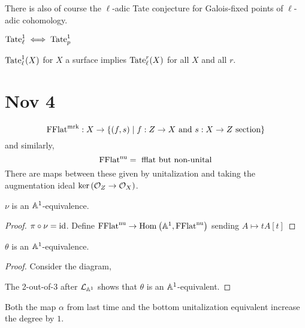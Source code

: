 \documentclass[12pt]{article}
\begin{document}
There is also of course the $\ell$-adic Tate conjecture for Galois-fixed points of $\ell$-adic cohomology. 

\begin{prop}
$\mathrm{Tate}^1_\ell \iff \mathrm{Tate}^1_p$
\end{prop}

\begin{theorem}
$\mathrm{Tate}^1_{\ell}(X)$ for $X$ a surface implies $\mathrm{Tate}^r_\ell(X)$ for all $X$ and all $r$. 
\end{theorem}


\section{Nov 4}

\newcommand{\mrk}{\mathrm{mrk}}
\newcommand{\tnu}{\mathrm{nu}}

\begin{defn}
\[ \mathrm{FFlat}^{\text{mrk}} : X \to \{ (f, s) \mid f : Z \to X \text{ and } s : X \to Z \text{ section} \} \]
and similarly,
\[ \mathrm{FFlat}^{\text{nu}} = \text{ fflat but non-unital} \]
There are maps between these given by unitalization and taking the augmentation ideal $\ker{(\mathcal{O}_{Z} \to \mathcal{O}_{X})}$.
\end{defn}

\begin{prop}
$\nu$ is an $\mathbb{A}^1$-equivalence.
\end{prop}

\begin{proof}
$\pi \circ \nu = \mathrm{id}$. Define $\FFlat^{\tnu} \to \Hom{}{\A^1}{\FFlat^{\tnu}}$ sending $A \mapsto t A[t]$ 
\end{proof}

\begin{lemma}
$\theta$ is an $\mathbb{A}^1$-equivalence.
\end{lemma}

\begin{proof}
Consider the diagram,
\begin{center}
\end{center}
The 2-out-of-3 after $\mathcal{L}_{\mathbb{A}^1}$ shows that $\theta$ is an $\mathbb{A}^1$-equivalent. 
\end{proof}

\begin{rmk}
Both the map $\alpha$ from last time and the bottom unitalization equivalent increase the degree by $1$. 
\end{rmk}
\end{document}
